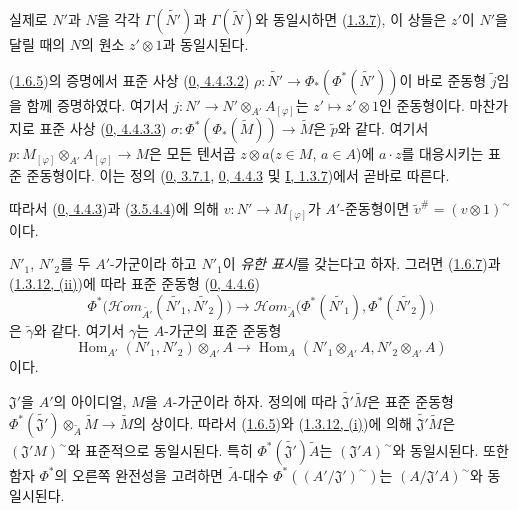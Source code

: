 실제로 $N'$과 $N$을 각각 $\Gamma(\widetilde{N'})$과
$\Gamma(\widetilde{N})$와 동일시하면
(\hyperref[I.1.3.7-ko]{1.3.7}), 이 상들은 $z'$이 $N'$을 달릴 때의
$N$의 원소 $z'\otimes1$과 동일시된다.

\begin{env}[1.6.7]
\label{I.1.6.7-ko}
(\hyperref[I.1.6.5-ko]{1.6.5})의 증명에서 표준 사상
(\hyperref[0.4.4.3.2-ko]{0, 4.4.3.2})
$\rho:\widetilde{N'}\to\Phi_*(\Phi^*(\widetilde{N'}))$이 바로
준동형 $\widetilde{j}$임을 함께 증명하였다.
여기서 $j:N'\to N'\otimes_{A'}A_{[\varphi]}$는
$z'\mapsto z'\otimes1$인 준동형이다. 마찬가지로 표준 사상
(\hyperref[0.4.4.3.3-ko]{0, 4.4.3.3})
$\sigma:\Phi^*(\Phi_*(\widetilde{M}))\to\widetilde{M}$은
$\widetilde{p}$와 같다. 여기서
$p:M_{[\varphi]}\otimes_{A'}A_{[\varphi]}\to M$은 모든 텐서곱
$z\otimes a$($z\in M$, $a\in A$)에 $a\cdot z$를 대응시키는 표준
준동형이다. 이는 정의
(\hyperref[0.3.7.1-ko]{0, 3.7.1},
\hyperref[0.4.4.3-ko]{0, 4.4.3} 및
\hyperref[I.1.3.7-ko]{I, 1.3.7})에서 곧바로 따른다.

따라서 (\hyperref[0.4.4.3-ko]{0, 4.4.3})과
(\hyperref[0.3.5.4.4-ko]{3.5.4.4})에 의해
$v:N'\to M_{[\varphi]}$가 $A'$-준동형이면
$\widetilde{v}^{\#}=(v\otimes1)^{\sim}$이다.
\end{env}

\begin{env}[1.6.8]
\label{I.1.6.8-ko}
$N'_1$, $N'_2$를 두 $A'$-가군이라 하고 $N'_1$이 \emph{유한 표시}를
갖는다고 하자. 그러면
(\hyperref[I.1.6.7-ko]{1.6.7})과
(\hyperref[I.1.3.12-ko]{1.3.12, (ii)})에 따라 표준 준동형
(\hyperref[0.4.4.6-ko]{0, 4.4.6})
\[
  \Phi^*\bigl(\mathscr{H}\!om_{\widetilde{A'}}
    (\widetilde{N'_1},\widetilde{N'_2})\bigr)
  \longrightarrow
  \mathscr{H}\!om_{\widetilde A}
    \bigl(\Phi^*(\widetilde{N'_1}),\Phi^*(\widetilde{N'_2})\bigr)
\]
은 $\widetilde{\gamma}$와 같다. 여기서 $\gamma$는 $A$-가군의
표준 준동형
\[
  \operatorname{Hom}_{A'}(N'_1,N'_2)\otimes_{A'}A
  \longrightarrow
  \operatorname{Hom}_A(N'_1\otimes_{A'}A,N'_2\otimes_{A'}A)
\]
이다.
\end{env}

\begin{env}[1.6.9]
\label{I.1.6.9-ko}
$\mathfrak{J}'$을 $A'$의 아이디얼, $M$을 $A$-가군이라 하자. 정의에
따라 $\widetilde{\mathfrak{J}'}\widetilde M$은 표준 준동형
$\Phi^*(\widetilde{\mathfrak{J}'})
\otimes_{\widetilde A}\widetilde M\to\widetilde M$의 상이다. 따라서
(\hyperref[I.1.6.5-ko]{1.6.5})와
(\hyperref[I.1.3.12-ko]{1.3.12, (i)})에 의해
$\widetilde{\mathfrak{J}'}\widetilde M$은
$(\mathfrak{J}'M)^{\sim}$와 표준적으로 동일시된다. 특히
$\Phi^*(\widetilde{\mathfrak{J}'})\widetilde A$는
$(\mathfrak{J}'A)^{\sim}$와 동일시된다. 또한 함자 $\Phi^*$의 오른쪽
완전성을 고려하면 $\widetilde A$-대수
$\Phi^*((A'/\mathfrak{J}')^{\sim})$는
$(A/\mathfrak{J}'A)^{\sim}$와 동일시된다.
\end{env}

